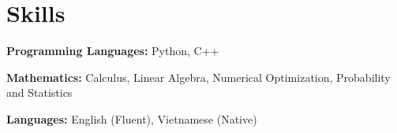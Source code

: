 \section{Skills}
\resumeSubHeadingListStart

    \resumeProjectHeading
    {\textbf{Programming Languages:} {Python, C++}}{}


    \resumeProjectHeading
    {\textbf{Mathematics:} {Calculus, Linear Algebra, Numerical Optimization, Probability and Statistics}}{}

    \resumeProjectHeading
    {\textbf{Languages:} {English (Fluent), Vietnamese (Native)}}{}

\resumeSubHeadingListEnd
